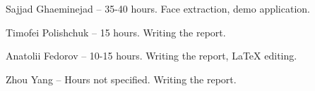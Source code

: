 \documentclass{article}
\begin{document}
Sajjad Ghaeminejad – 35-40 hours. Face extraction, demo application.

Timofei Polishchuk – 15 hours. Writing the report. 

Anatolii Fedorov – 10-15 hours. Writing the report, LaTeX editing.

Zhou Yang – Hours not specified. Writing the report.












\printbibliography



\end{document}
